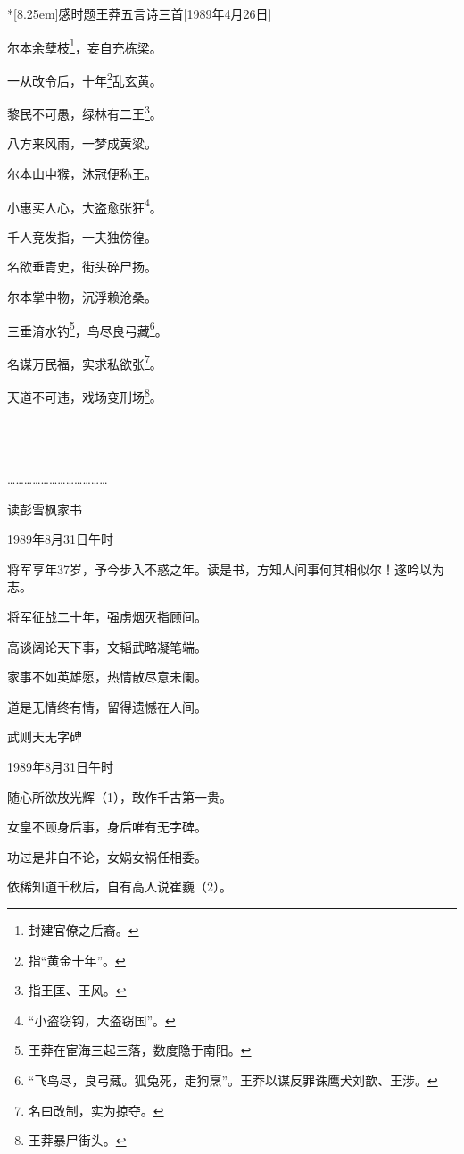 \documentclass[../../dazhuan.tex]{subfiles}
\begin{document}
\begin{poem}*[8.25em]{感时题王莽五言诗三首}[1989年4月26日]
\subtitle{一}

尔本余孽枝\footnote{封建官僚之后裔。}，妄自充栋梁。

一从改令后，十年\footnote{指“黄金十年”。}乱玄黄。

黎民不可愚，绿林有二王\footnote{指王匡、王风。}。

八方来风雨，一梦成黄粱。

\subtitle{二}

尔本山中猴，沐冠便称王。

小惠买人心，大盗愈张狂\footnote{“小盗窃钩，大盗窃国”。}。

千人竞发指，一夫独傍徨。

名欲垂青史，街头碎尸扬。

\subtitle{三}

尔本掌中物，沉浮赖沧桑。

三垂淯水钓\footnote{王莽在宦海三起三落，数度隐于南阳。}，鸟尽良弓藏\footnote{“飞鸟尽，良弓藏。狐兔死，走狗烹”。王莽以谋反罪诛鹰犬刘歆、王涉。}。

名谋万民福，实求私欲张\footnote{名曰改制，实为掠夺。}。

天道不可违，戏场变刑场\footnote{王莽暴尸街头。}。

\end{poem}

\mbox{}\\
\\
\\

………………………………


读彭雪枫家书

1989年8月31日午时

将军享年37岁，予今步入不惑之年。读是书，方知人间事何其相似尔！遂吟以为志。

将军征战二十年，强虏烟灭指顾间。

高谈阔论天下事，文韬武略凝笔端。

家事不如英雄愿，热情散尽意未阑。

道是无情终有情，留得遗憾在人间。



武则天无字碑

1989年8月31日午时

随心所欲放光辉（1），敢作千古第一贵。

女皇不顾身后事，身后唯有无字碑。

功过是非自不论，女娲女祸任相委。

依稀知道千秋后，自有高人说崔巍（2）。
\end{document}
